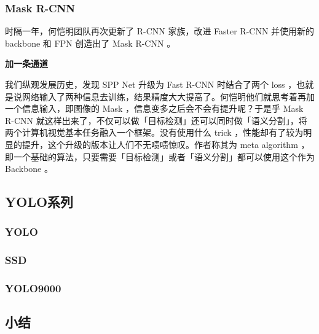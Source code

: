 \subsubsection{Mask R-CNN}
时隔一年，何恺明团队再次更新了 R-CNN 家族，改进 Faster R-CNN 并使用新的 backbone 和 FPN 创造出了 Mask R-CNN 。

\textbf{加一条通道}

我们纵观发展历史，发现 SPP Net 升级为 Fast R-CNN 时结合了两个 loss ，也就是说网络输入了两种信息去训练，结果精度大大提高了。何恺明他们就思考着再加一个信息输入，即图像的 Mask ，信息变多之后会不会有提升呢？于是乎 Mask R-CNN 就这样出来了，不仅可以做「目标检测」还可以同时做「语义分割」，将两个计算机视觉基本任务融入一个框架。没有使用什么 trick ，性能却有了较为明显的提升，这个升级的版本让人们不无啧啧惊叹。作者称其为 meta algorithm ，即一个基础的算法，只要需要「目标检测」或者「语义分割」都可以使用这个作为 Backbone 。
\subsection{YOLO系列}
\subsubsection{YOLO}
\subsubsection{SSD}
\subsubsection{YOLO9000}
\subsection{小结}

